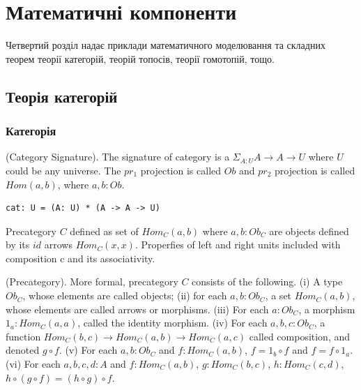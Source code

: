 \chapter{Математичні компоненти}

Четвертий розділ надає приклади математичного моделювання
та складних теорем теорії категорій, теорій топосів, теорії гомотопій, тощо.

\section{Теорія категорій}

\subsection{Категорія}

\begin{definition} (Category Signature).
The signature of category is
a $\Sigma_{A:U}A \rightarrow A \rightarrow U$ where $U$ could be any universe.
The $pr_1$ projection is called $Ob$ and $pr_2$ projection is
called $Hom(a,b)$, where $a,b:Ob$.
\begin{lstlisting}
cat: U = (A: U) * (A -> A -> U)
\end{lstlisting}
\end{definition}

Precategory $C$ defined as set of $Hom_C(a,b)$ where $a,b:Ob_C$
are objects defined by its $id$ arrows $Hom_C(x,x)$.
Properfies of left and right units included with composition c
and its associativity.

\begin{definition} (Precategory).
More formal, precategory $C$ consists of the following.
(i) A type $Ob_C$, whose elements are called objects;
(ii) for each $a,b: Ob_C$, a set $Hom_C(a,b)$, whose
elements are called arrows or morphisms.
(iii) For each $a: Ob_C$, a morphism $1_a : Hom_C(a,a)$,
called the identity morphism.
(iv) For each $a,b,c: Ob_C$, a function
$Hom_C(b,c) \rightarrow Hom_C(a,b) \rightarrow Hom_C(a,c)$
called composition, and denoted $g \circ f$.
(v) For each $a,b: Ob_C$ and $f: Hom_C(a,b)$,
$f = 1_b \circ f$ and $f = f \circ 1_a$.
(vi) For each $a,b,c,d: A$ and
$f: Hom_C(a,b)$, $g: Hom_C(b,c)$, $h: Hom_C(c,d)$,
$h \circ (g \circ f ) = (h \circ g) \circ f$.
\end{definition}

